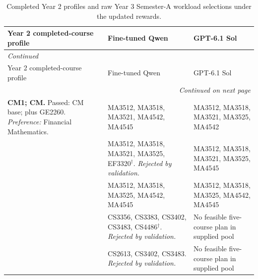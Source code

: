 \documentclass{article}
\begin{document}
{\small
\setlength{\tabcolsep}{4pt}
\renewcommand{\arraystretch}{1.12}
\begin{longtable}{p{2.45in}p{1.35in}p{1.35in}}
\caption{Completed Year 2 profiles and raw Year 3 Semester-A workload selections under the updated rewards.}\label{tab:retest-input07}\\
\toprule
Year 2 completed-course profile & Fine-tuned Qwen & GPT-6.1 Sol\\
\midrule
\endfirsthead
\multicolumn{3}{l}{\textit{Continued}}\\
\toprule
Year 2 completed-course profile & Fine-tuned Qwen & GPT-6.1 Sol\\
\midrule
\endhead
\midrule
\multicolumn{3}{r}{\textit{Continued on next page}}\\
\endfoot
\bottomrule
\endlastfoot
{\raggedright \textbf{CM1; CM.} Passed: CM base; plus GE2260. \textit{Preference:} Financial Mathematics.\par} & {\raggedright MA3512, MA3518, MA3521, MA4542, MA4545\par} & {\raggedright MA3512, MA3518, MA3521, MA3525, MA4542\par}\\
\addlinespace[4pt]
{\raggedright \textbf{CM2; CM.} Passed: CM base except MA3526; plus GE2260. \textit{Preference:} Financial Mathematics.\par} & {\raggedright MA3512, MA3518, MA3521, MA3525, EF3320$^{\dagger}$. \textit{Rejected by validation.}\par} & {\raggedright MA3512, MA3518, MA3521, MA3525, MA4545\par}\\
\addlinespace[4pt]
{\raggedright \textbf{CM3; CM.} Passed: CM base; plus GE2260. \textit{Preference:} Enriched Mathematics.\par} & {\raggedright MA3512, MA3518, MA3525, MA4542, MA4545\par} & {\raggedright MA3512, MA3518, MA3525, MA4542, MA4545\par}\\
\addlinespace[4pt]
{\raggedright \textbf{CS1; CS.} Passed: CS base; plus GE2340. \textit{Preference:} Artificial Intelligence.\par} & {\raggedright CS3356, CS3383, CS3402, CS3483, CS4486$^{\dagger}$. \textit{Rejected by validation.}\par} & {\raggedright No feasible five-course plan in supplied pool\par}\\
\addlinespace[4pt]
{\raggedright \textbf{CS2; CS.} Passed: CS base except CS3342; plus GE2340. \textit{Preference:} Artificial Intelligence.\par} & {\raggedright CS2613, CS3402, CS3483. \textit{Rejected by validation.}\par} & {\raggedright No feasible five-course plan in supplied pool\par}\\

\end{longtable}}
\end{document}
